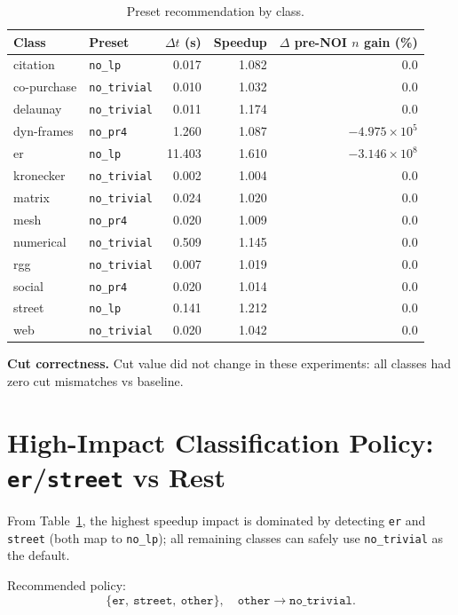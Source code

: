 \documentclass[11pt]{article}
\begin{document}
\begin{table}[h]
\centering
\small
\begin{tabular}{l l r r r}
\toprule
Class & Preset & $\Delta t$ (s) & Speedup & $\Delta$ pre-NOI $n$ gain (\%) \\
\midrule
citation     & \texttt{no\_lp}      & 0.017 & 1.082 & 0.0 \\
co-purchase  & \texttt{no\_trivial} & 0.010 & 1.032 & 0.0 \\
delaunay     & \texttt{no\_trivial} & 0.011 & 1.174 & 0.0 \\
dyn-frames   & \texttt{no\_pr4}     & 1.260 & 1.087 & $-4.975\times10^5$ \\
er           & \texttt{no\_lp}      & 11.403 & 1.610 & $-3.146\times10^8$ \\
kronecker    & \texttt{no\_trivial} & 0.002 & 1.004 & 0.0 \\
matrix       & \texttt{no\_trivial} & 0.024 & 1.020 & 0.0 \\
mesh         & \texttt{no\_pr4}     & 0.020 & 1.009 & 0.0 \\
numerical    & \texttt{no\_trivial} & 0.509 & 1.145 & 0.0 \\
rgg          & \texttt{no\_trivial} & 0.007 & 1.019 & 0.0 \\
social       & \texttt{no\_pr4}     & 0.020 & 1.014 & 0.0 \\
street       & \texttt{no\_lp}      & 0.141 & 1.212 & 0.0 \\
web          & \texttt{no\_trivial} & 0.020 & 1.042 & 0.0 \\
\bottomrule
\end{tabular}
\caption{Preset recommendation by class.}
\label{tab:class-preset-gains}
\end{table}

\noindent\textbf{Cut correctness.} Cut value did not change in these experiments: all classes had zero cut mismatches vs baseline.

\section{High-Impact Classification Policy: \texttt{er}/\texttt{street} vs Rest}
From Table~\ref{tab:class-preset-gains}, the highest speedup impact is dominated by detecting \texttt{er} and \texttt{street} (both map to \texttt{no\_lp}); all remaining classes can safely use \texttt{no\_trivial} as the default.

Recommended policy:
\[
\{\texttt{er},\ \texttt{street},\ \texttt{other}\},\quad
\texttt{other} \rightarrow \texttt{no\_trivial}.
\]
\end{document}
